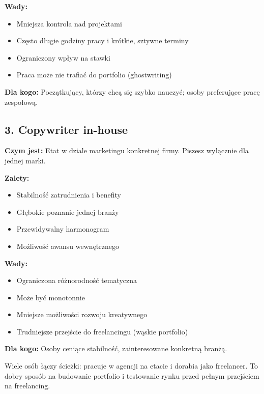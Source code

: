 \documentclass[
  12pt,
  a4paper,
  twoside,
  openright,
  12pt,
  DIV=12,
  BCOR=12mm]{scrbook}
\providecommand{\tightlist}{%
  \setlength{\itemsep}{0pt}\setlength{\parskip}{0pt}}\usepackage{longtable,booktabs,array}
\begin{document}
\textbf{Wady:}

\begin{itemize}
\tightlist
\item
  Mniejsza kontrola nad projektami
\item
  Często długie godziny pracy i krótkie, sztywne terminy
\item
  Ograniczony wpływ na stawki
\item
  Praca może nie trafiać do portfolio (ghostwriting)
\end{itemize}

\textbf{Dla kogo:} Początkujący, którzy chcą się szybko nauczyć; osoby
preferujące pracę zespołową.

\subsection{3. Copywriter in-house}\label{copywriter-in-house}

\textbf{Czym jest:} Etat w dziale marketingu konkretnej firmy. Piszesz
wyłącznie dla jednej marki.

\textbf{Zalety:}

\begin{itemize}
\tightlist
\item
  Stabilność zatrudnienia i benefity
\item
  Głębokie poznanie jednej branży
\item
  Przewidywalny harmonogram
\item
  Możliwość awansu wewnętrznego
\end{itemize}

\textbf{Wady:}

\begin{itemize}
\tightlist
\item
  Ograniczona różnorodność tematyczna
\item
  Może być monotonnie
\item
  Mniejsze możliwości rozwoju kreatywnego
\item
  Trudniejsze przejście do freelancingu (wąskie portfolio)
\end{itemize}

\textbf{Dla kogo:} Osoby ceniące stabilność, zainteresowane konkretną
branżą.

\begin{wskazowka}
Wiele osób łączy ścieżki: pracuje w agencji na etacie i dorabia jako freelancer. To dobry sposób na budowanie portfolio i testowanie rynku przed pełnym przejściem na freelancing.
\end{wskazowka}
\end{document}
